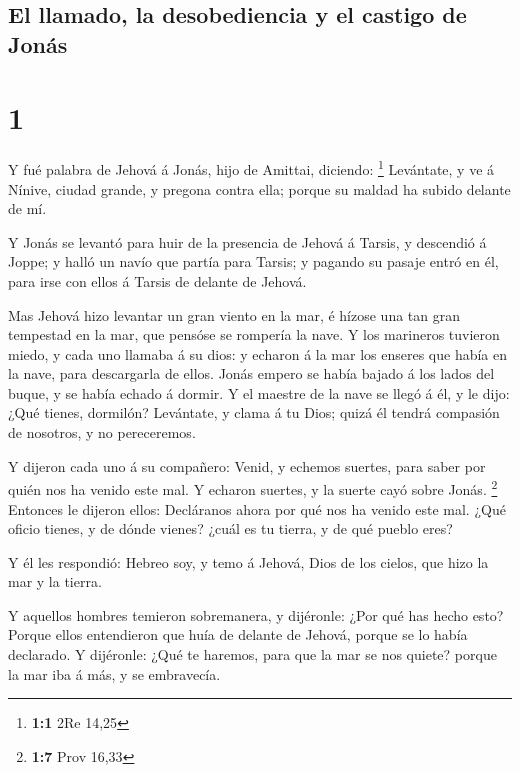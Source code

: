 \hypertarget{el-llamado-la-desobediencia-y-el-castigo-de-jonuxe1s}{%
\subsection{El llamado, la desobediencia y el castigo de
Jonás}\label{el-llamado-la-desobediencia-y-el-castigo-de-jonuxe1s}}

\hypertarget{section}{%
\section{1}\label{section}}

 Y fué palabra de Jehová á Jonás, hijo de Amittai,
diciendo: \footnote{\textbf{1:1} 2Re 14,25}  Levántate, y
ve á Nínive, ciudad grande, y pregona contra ella; porque su maldad ha
subido delante de mí.

 Y Jonás se levantó para huir de la presencia de Jehová á
Tarsis, y descendió á Joppe; y halló un navío que partía para Tarsis; y
pagando su pasaje entró en él, para irse con ellos á Tarsis de delante
de Jehová.

 Mas Jehová hizo levantar un gran viento en la mar, é
hízose una tan gran tempestad en la mar, que pensóse se rompería la
nave.  Y los marineros tuvieron miedo, y cada uno llamaba
á su dios: y echaron á la mar los enseres que había en la nave, para
descargarla de ellos. Jonás empero se había bajado á los lados del
buque, y se había echado á dormir.  Y el maestre de la
nave se llegó á él, y le dijo: ¿Qué tienes, dormilón? Levántate, y clama
á tu Dios; quizá él tendrá compasión de nosotros, y no pereceremos.

 Y dijeron cada uno á su compañero: Venid, y echemos
suertes, para saber por quién nos ha venido este mal. Y echaron suertes,
y la suerte cayó sobre Jonás. \footnote{\textbf{1:7} Prov 16,33}
 Entonces le dijeron ellos: Decláranos ahora por qué nos
ha venido este mal. ¿Qué oficio tienes, y de dónde vienes? ¿cuál es tu
tierra, y de qué pueblo eres?

 Y él les respondió: Hebreo soy, y temo á Jehová, Dios de
los cielos, que hizo la mar y la tierra.

 Y aquellos hombres temieron sobremanera, y dijéronle:
¿Por qué has hecho esto? Porque ellos entendieron que huía de delante de
Jehová, porque se lo había declarado.  Y dijéronle: ¿Qué
te haremos, para que la mar se nos quiete? porque la mar iba á más, y se
embravecía.

